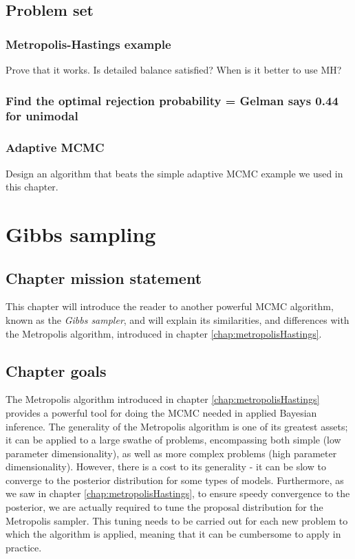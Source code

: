 \documentclass[11pt,fullpage]{book}
\begin{document}
\section{Problem set}
\subsection{Metropolis-Hastings example}
Prove that it works. Is detailed balance satisfied? When is it better to use MH?
\subsection{Find the optimal rejection probability = Gelman says 0.44 for unimodal}
\subsection{Adaptive MCMC}
Design an algorithm that beats the simple adaptive MCMC example we used in this chapter.

\chapter{Gibbs sampling}\label{chap:Gibbs}
\section{Chapter mission statement}
This chapter will introduce the reader to another powerful MCMC algorithm, known as the \textit{Gibbs sampler}, and will explain its similarities, and differences with the Metropolis algorithm, introduced in chapter \ref{chap:metropolisHastings}.

\section{Chapter goals}
The Metropolis algorithm introduced in chapter \ref{chap:metropolisHastings} provides a powerful tool for doing the MCMC needed in applied Bayesian inference. The generality of the Metropolis algorithm is one of its greatest assets; it can be applied to a large swathe of problems, encompassing both simple (low parameter dimensionality), as well as more complex problems (high parameter dimensionality). However, there is a cost to its generality - it can be slow to converge to the posterior distribution for some types of models. Furthermore, as we saw in chapter \ref{chap:metropolisHastings}, to ensure speedy convergence to the posterior, we are actually required to tune the proposal distribution for the Metropolis sampler. This tuning needs to be carried out for each new problem to which the algorithm is applied, meaning that it can be cumbersome to apply in practice. 
\end{document}
